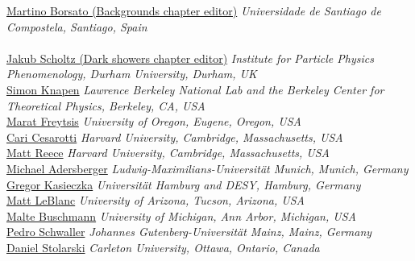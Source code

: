 \noindent\href{mailto:martino.borsato@cern.ch}{Martino Borsato (Backgrounds chapter editor)} 
\emph{Universidade de Santiago de Compostela, Santiago, Spain}\\

\text{ \; }\\

\noindent\href{mailto:jakubscholtz@gmail.com}{Jakub Scholtz (Dark showers chapter editor)}
\emph{Institute for Particle Physics Phenomenology, Durham University, Durham, UK}\\

\noindent\href{mailto:smknapen@lbl.gov}{Simon Knapen}
\emph{Lawrence Berkeley National Lab and the Berkeley Center for Theoretical Physics, Berkeley, CA, USA}\\

\noindent\href{mailto:freytsis@uoregon.edu}{Marat Freytsis}
\emph{University of Oregon, Eugene, Oregon, USA}\\

\noindent\href{mailto:ccesarotti@g.harvard.edu}{Cari Cesarotti}
\emph{Harvard University, Cambridge, Massachusetts, USA}\\

\noindent\href{mailto:mreece@g.harvard.edu}{Matt Reece}
\emph{Harvard University, Cambridge, Massachusetts, USA}\\

\noindent\href{mailto:michael.adersberger@cern.ch}{Michael Adersberger}
\emph{Ludwig-Maximilians-Universit\"{a}t Munich, Munich, Germany}\\

\noindent\href{mailto:gregor.kasieczka@cern.ch}{Gregor Kasieczka}
\emph{Universit\"{a}t Hamburg and DESY, Hamburg, Germany}\\

\noindent\href{mailto:matt.leblanc@cern.ch}{Matt LeBlanc}
\emph{University of Arizona, Tucson, Arizona, USA}\\

\noindent\href{mailto:buschman@umich.edu}{Malte Buschmann}
\emph{University of Michigan, Ann Arbor, Michigan, USA}\\

\noindent\href{mailto:pedro.schwaller@uni-mainz.de}{Pedro Schwaller}
\emph{Johannes Gutenberg-Universit\"{a}t Mainz, Mainz, Germany}\\

\noindent\href{mailto:stolar@physics.carleton.ca}{Daniel Stolarski}
\emph{Carleton University, Ottawa, Ontario, Canada}\\

